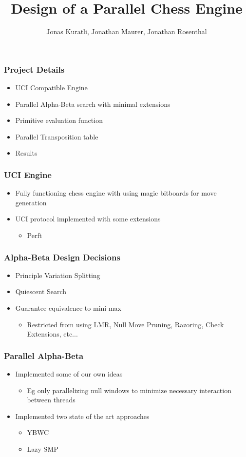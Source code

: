\documentclass{beamer}
\title{Design of a Parallel Chess Engine}
\author{Jonas Kuratli, Jonathan Maurer, Jonathan Rosenthal}
\begin{document}
\frame{\titlepage}

\begin{frame}
\frametitle{Project Details}
\begin{itemize}
\item UCI Compatible Engine
\item Parallel Alpha-Beta search with minimal extensions
\item Primitive evaluation function
\item Parallel Transposition table
\pause
\item Results
\end{itemize}
\end{frame}

\begin{frame}
\frametitle{UCI Engine}
\begin{itemize}
\item Fully functioning chess engine with using magic bitboards for move generation
\item UCI protocol implemented with some extensions
\begin{itemize}
\item Perft
\end{itemize}
\end{itemize}
\end{frame}

\begin{frame}
\frametitle{Alpha-Beta Design Decisions}
\begin{itemize}
\item Principle Variation Splitting
\item Quiescent Search
\item Guarantee equivalence to mini-max
\begin{itemize}
\item Restricted from using LMR, Null Move Pruning, Razoring, Check Extensions, etc...
\end{itemize}
\end{itemize}
\end{frame}

\begin{frame}
\frametitle{Parallel Alpha-Beta}
\begin{itemize}
\item Implemented some of our own ideas
\begin{itemize}
\item Eg only parallelizing null windows to minimize necessary interaction between threads
\end{itemize}
\item Implemented two state of the art approaches
\begin{itemize}
\item YBWC
\item Lazy SMP
\end{itemize}
\end{itemize}
\end{frame}
\end{document}

